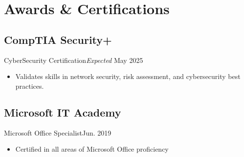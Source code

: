\section{Awards \& Certifications}
\subsection{CompTIA Security+}{CyberSecurity Certification}{}{\textit{Expected} May 2025}
\begin{itemize}
    \item Validates skills in network security, risk assessment, and cybersecurity best practices.
\end{itemize}


\subsection{Microsoft IT Academy}{Microsoft Office Specialist}{}{Jun. 2019}
\begin{itemize}
    \item Certified in all areas of Microsoft Office proficiency
\end{itemize}
